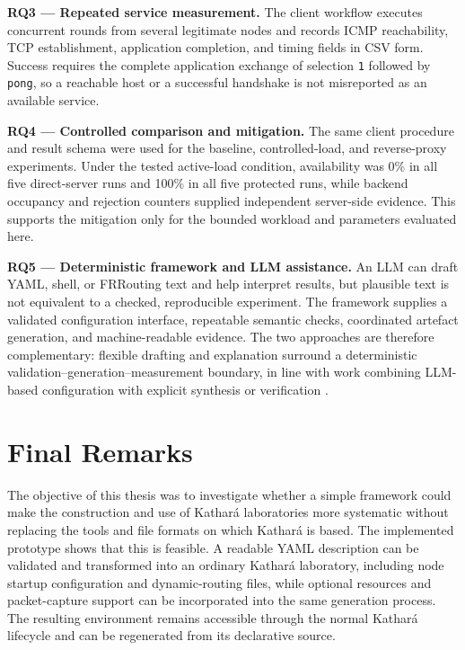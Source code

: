 \noindent\textbf{RQ3 --- Repeated service measurement.}
The client workflow executes concurrent rounds from several legitimate nodes
and records ICMP reachability, TCP establishment, application completion, and
timing fields in CSV form. Success requires the complete application exchange
of selection \texttt{1} followed by \texttt{pong}, so a reachable host or a
successful handshake is not misreported as an available service.

\noindent\textbf{RQ4 --- Controlled comparison and mitigation.}
The same client procedure and result schema were used for the baseline,
controlled-load, and reverse-proxy experiments. Under the tested active-load
condition, availability was 0\% in all five direct-server runs and 100\% in all
five protected runs, while backend occupancy and rejection counters supplied
independent server-side evidence. This supports the mitigation only for the
bounded workload and parameters evaluated here.

\noindent\textbf{RQ5 --- Deterministic framework and LLM assistance.}
An LLM can draft YAML, shell, or FRRouting text and help interpret results, but
plausible text is not equivalent to a checked, reproducible experiment. The
framework supplies a validated configuration interface, repeatable semantic
checks, coordinated artefact generation, and machine-readable evidence. The
two approaches are therefore complementary: flexible drafting and explanation
surround a deterministic validation--generation--measurement boundary, in line
with work combining LLM-based configuration with explicit synthesis or
verification \cite{wang2024netconfeval,lira2025llmnetcfg}.

\section{Final Remarks}
\label{sec:conclusion-final-remarks}

The objective of this thesis was to investigate whether a simple framework
could make the construction and use of Kathar\'a laboratories more systematic
without replacing the tools and file formats on which Kathar\'a is based. The
implemented prototype shows that this is feasible. A readable YAML description
can be validated and transformed into an ordinary Kathar\'a laboratory,
including node startup configuration and dynamic-routing files, while optional
resources and packet-capture support can be incorporated into the same
generation process. The resulting environment remains accessible through the
normal Kathar\'a lifecycle and can be regenerated from its declarative source.

